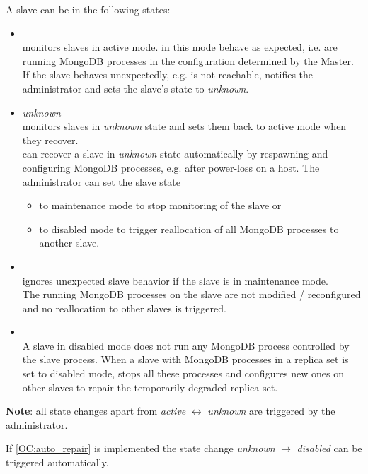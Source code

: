 \documentclass[a4paper, 11pt]{article}
\begin{document}
A slave can be in the following states:
\begin{itemize}
	\item {}\\
	\mamid monitors \glspl{slave} in active mode.  in this mode behave as expected, i.e. are running MongoDB processes in the configuration determined by the \hyperref[SM:Master]{Master}.\\
	If the slave behaves unexpectedly, e.g. is not reachable, \mamid notifies the \gls{administrator} and sets the slave's state to \emph{unknown}.
	\item \emph{unknown}\\
	\mamid monitors \glspl{slave} in \emph{unknown} state and sets them back to \gls{active mode} when they recover.\\
	\mamid can recover a slave in \emph{unknown} state automatically by respawning and configuring MongoDB processes, e.g. after power-loss on a  \gls{host}.
	The \gls{administrator} can set the slave state
	\begin{itemize}
		\item to \gls{maintenance mode} to stop monitoring of the slave or
		\item to \gls{disabled mode} to trigger reallocation of all \gls{MongoDB} processes to another slave.
	\end{itemize}
	\item {}\\
	\mamid ignores unexpected slave behavior if the slave is in maintenance mode.\\The running MongoDB processes on the slave are not modified / reconfigured and no reallocation to other slaves is triggered.
	\item {}\\
	A \gls{slave} in disabled mode does not run any \gls{MongoDB} process controlled by the slave process. When a \gls{slave} with MongoDB processes in a \gls{replica set} is set to disabled mode, \mamid stops all these processes and configures new ones on other \glspl{slave} to repair the temporarily degraded replica set.
\end{itemize}

\textbf{Note}: all state changes apart from \textit{active} $\leftrightarrow$ \textit{unknown} are triggered by the \gls{administrator}.

If \ref{OC:auto_repair} is implemented the state change \textit{unknown} $\rightarrow$ \textit{disabled} can be triggered automatically.
\end{document}
